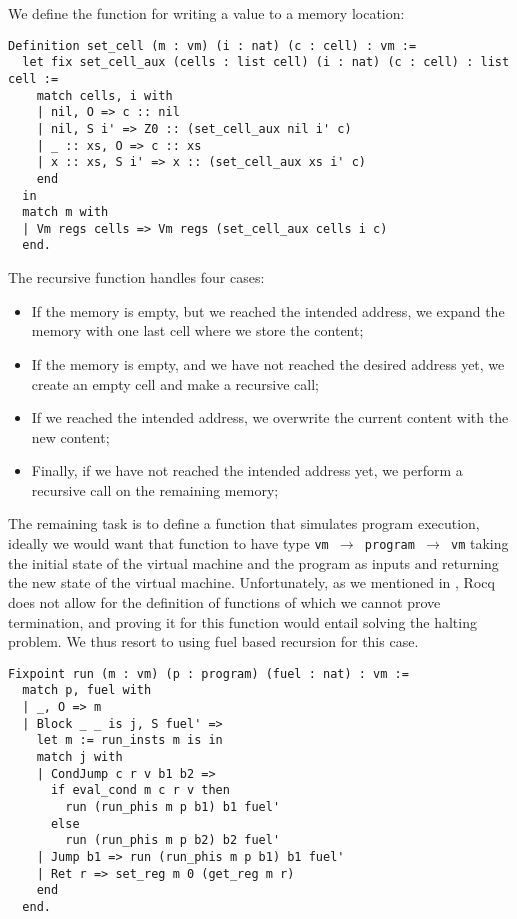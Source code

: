 We define the function for writing a value to a memory location:

\begin{lstlisting}[style=Rocq]
Definition set_cell (m : vm) (i : nat) (c : cell) : vm :=
  let fix set_cell_aux (cells : list cell) (i : nat) (c : cell) : list cell :=
    match cells, i with
    | nil, O => c :: nil
    | nil, S i' => Z0 :: (set_cell_aux nil i' c)
    | _ :: xs, O => c :: xs
    | x :: xs, S i' => x :: (set_cell_aux xs i' c)
    end
  in
  match m with
  | Vm regs cells => Vm regs (set_cell_aux cells i c)
  end.
\end{lstlisting}

The recursive function handles four cases:
\begin{itemize}
  \item If the memory is empty, but we reached the intended address, we expand the memory with one last cell where we store the content;
  \item If the memory is empty, and we have not reached the desired address yet, we create an empty cell and make a recursive call;
  \item If we reached the intended address, we overwrite the current content with the new content;
  \item Finally, if we have not reached the intended address yet, we perform a recursive call on the remaining memory;
\end{itemize}

The remaining task is to define a function that simulates program execution, ideally we would want that function to have type \texttt{vm $\to$ program $\to$ vm} taking the initial state of the virtual machine and the program as inputs and returning the new state of the virtual machine.
Unfortunately, as we mentioned in , Rocq does not allow for the definition of functions of which we cannot prove termination, and proving it for this function would entail solving the halting problem. We thus resort to using fuel based recursion for this case.

\begin{lstlisting}[style=Rocq]
Fixpoint run (m : vm) (p : program) (fuel : nat) : vm :=
  match p, fuel with
  | _, O => m
  | Block _ _ is j, S fuel' =>
    let m := run_insts m is in
    match j with
    | CondJump c r v b1 b2 =>
      if eval_cond m c r v then
        run (run_phis m p b1) b1 fuel'
      else
        run (run_phis m p b2) b2 fuel'
    | Jump b1 => run (run_phis m p b1) b1 fuel'
    | Ret r => set_reg m 0 (get_reg m r)
    end
  end.
\end{lstlisting}

